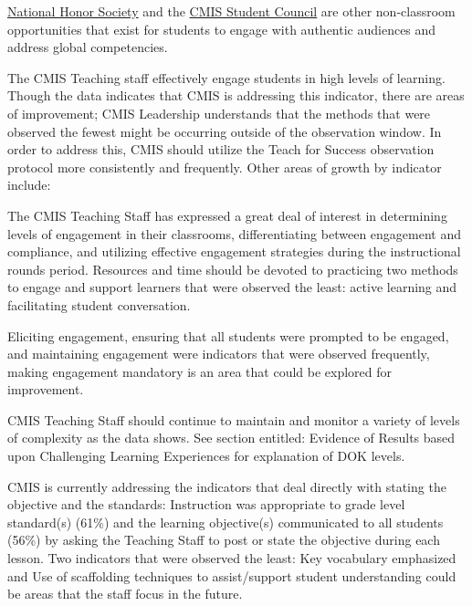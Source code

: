 \documentclass{report}
\begin{document}
\begin{findings}
\href{https://drive.google.com/drive/folders/0B0TYmzaZNi3fMGp2X0xiMk52alk?usp=sharing}{National Honor Society} and the \href{https://drive.google.com/drive/folders/0B0TYmzaZNi3fSVVEd0VWTkcwVU0?usp=sharing}{CMIS Student Council} are other non-classroom opportunities that exist for students to engage with authentic audiences and address global competencies. 

 
The CMIS Teaching staff effectively engage students in high levels of learning. Though the data indicates that CMIS is addressing this indicator, there are areas of improvement; CMIS Leadership understands that the methods that were observed the fewest might be occurring outside of the observation window. In order to address this, CMIS should utilize the Teach for Success observation protocol more consistently and frequently. Other areas of growth by indicator include: 


The CMIS Teaching Staff has expressed a great deal of interest in determining levels of engagement in their classrooms, differentiating between engagement and compliance, and utilizing effective engagement strategies during the instructional rounds period. Resources and time should be devoted to practicing two methods to engage and support learners that were observed the least: active learning and facilitating student conversation. 


Eliciting engagement, ensuring that all students were prompted to be engaged, and maintaining engagement were indicators that were observed frequently, making engagement mandatory is an area that could be explored for improvement. 


CMIS Teaching Staff should continue to maintain and monitor a variety of levels of complexity as the data shows. See section entitled: Evidence of Results based upon Challenging Learning Experiences for explanation of DOK levels. 


CMIS is currently addressing the indicators that deal directly with stating the objective and the standards: Instruction was appropriate to grade level standard(s) (61\%) and the learning objective(s) communicated to all students (56\%) by asking the Teaching Staff to post or state the objective during each lesson. Two indicators that were observed the least: 
Key vocabulary emphasized and Use of scaffolding techniques to assist/support student understanding could be areas that the staff focus in the future. 


\end{findings}
\end{document}
